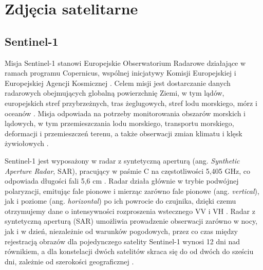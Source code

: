 \documentclass{amuthesis}
\begin{document}
\hypertarget{sec-satellite-imagery}{%
\section{Zdjęcia satelitarne}\label{sec-satellite-imagery}}

\hypertarget{sec-sentinel1}{%
\subsection{Sentinel-1}\label{sec-sentinel1}}

Misja Sentinel-1 stanowi Europejskie Obserwatorium Radarowe działające w
ramach programu Copernicus, wspólnej inicjatywy Komisji Europejskiej i
Europejskiej Agencji Kosmicznej \autocite{sentinel1_overview}. Celem
misji jest dostarczanie danych radarowych obejmujących globalną
powierzchnię Ziemi, w tym lądów, europejskich stref przybrzeżnych, tras
żeglugowych, stref lodu morskiego, mórz i oceanów
\autocite{hejmanowska_2020_dane,sentinel1_mission_objectives}. Misja
odpowiada na potrzeby monitorowania obszarów morskich i lądowych, w tym
przemieszczania lodu morskiego, transportu morskiego, deformacji i
przemieszczeń terenu, a także obserwacji zmian klimatu i klęsk
żywiołowych
\autocite{hejmanowska_2020_dane,sentinel1_mission_objectives}.

Sentinel-1 jest wyposażony w radar z syntetyczną aperturą (ang.
\emph{Synthetic Aperture Radar}, SAR), pracujący w paśmie C na
częstotliwości 5,405 GHz, co odpowiada długości fali 5,6 cm
\autocite{sentinel1_lulc,sentinel1_instrument_payload}. Radar działa
głównie w trybie podwójnej polaryzacji, emitując fale pionowe i mierząc
zarówno fale pionowe (ang. \emph{vertical}), jak i poziome (ang.
\emph{horizontal}) po ich powrocie do czujnika, dzięki czemu otrzymujemy
dane o intensywności rozproszenia wstecznego VV i VH
\autocite{sentinel1_lulc}. Radar z syntetyczną aperturą (SAR) umożliwia
prowadzenie obserwacji zarówno w nocy, jak i w dzień, niezależnie od
warunków pogodowych, przez co czas między rejestracją obrazów dla
pojedynczego satelity Sentinel-1 wynosi 12 dni nad równikiem, a dla
konstelacji dwóch satelitów skraca się do od dwóch do sześciu dni,
zależnie od szerokości geograficznej
\autocite{hejmanowska_2020_dane,sentinel1_overview}.
\end{document}
